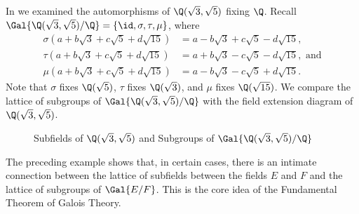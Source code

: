 \begin{example}
    In  we examined the automorphisms of $\Q(\sqrt3, \sqrt5)$ fixing $\Q$. Recall $\Gal{\Q(\sqrt3,\sqrt5)/\Q} = \{\id, \sigma, \tau, \mu\}$, where
    \begin{align*}
        \sigma(a + b\sqrt3 + c\sqrt5 + d\sqrt{15}) &= a - b\sqrt3 + c\sqrt5 - d\sqrt{15},\\
        \tau(a + b\sqrt3 + c\sqrt5 + d\sqrt{15}) &= a + b\sqrt3 - c\sqrt5 - d\sqrt{15}, \text{ and}\\
        \mu(a + b\sqrt3 + c\sqrt5 + d\sqrt{15}) &= a - b\sqrt3 - c\sqrt5 + d\sqrt{15}.
    \end{align*}
    Note that $\sigma$ fixes $\Q(\sqrt5)$, $\tau$ fixes $\Q(\sqrt3)$, and $\mu$ fixes $\Q(\sqrt{15})$. We compare the lattice of subgroups of $\Gal{\Q(\sqrt3,\sqrt5)/\Q}$ with the field extension diagram of $\Q(\sqrt3, \sqrt5)$.

    \begin{figure}[H]
        \centering
        \caption{Subfields of $\Q(\sqrt3,\sqrt5)$ and Subgroups of $\Gal{\Q(\sqrt3,\sqrt5)/\Q}$}
    \end{figure}
\end{example}

The preceding example shows that, in certain cases, there is an intimate connection between the lattice of subfields between the fields $E$ and $F$ and the lattice of subgroups of $\Gal{E/F}$. This is the core idea of the Fundamental Theorem of Galois Theory.

        
